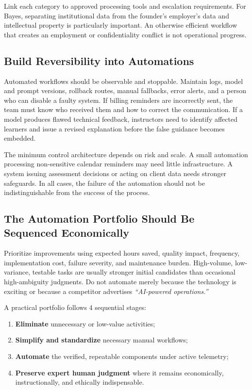 Link each category to approved processing tools and escalation requirements. For Bayes, separating institutional data from the founder's employer's data and intellectual property is particularly important. An otherwise efficient workflow that creates an employment or confidentiality conflict is not operational progress.

\subsection{Build Reversibility into Automations}
\label{sec:reversibility_in_automation}

Automated workflows should be observable and stoppable. Maintain logs, model and prompt versions, rollback routes, manual fallbacks, error alerts, and a person who can disable a faulty system. If billing reminders are incorrectly sent, the team must know who received them and how to correct the communication. If a model produces flawed technical feedback, instructors need to identify affected learners and issue a revised explanation before the false guidance becomes embedded.

The minimum control architecture depends on risk and scale. A small automation processing non-sensitive calendar reminders may need little infrastructure. A system issuing assessment decisions or acting on client data needs stronger safeguards. In all cases, the failure of the automation should not be indistinguishable from the success of the process.

\subsection{The Automation Portfolio Should Be Sequenced Economically}
\label{sec:sequencing_automation}

Prioritize improvements using expected hours saved, quality impact, frequency, implementation cost, failure severity, and maintenance burden. High-volume, low-variance, testable tasks are usually stronger initial candidates than occasional high-ambiguity judgments. Do not automate merely because the technology is exciting or because a competitor advertises \textit{``AI-powered operations.''}

A practical portfolio follows 4 sequential stages:
\begin{enumerate}
    \item \textbf{Eliminate} unnecessary or low-value activities;
    \item \textbf{Simplify and standardize} necessary manual workflows;
    \item \textbf{Automate} the verified, repeatable components under active telemetry;
    \item \textbf{Preserve expert human judgment} where it remains economically, instructionally, and ethically indispensable.
\end{enumerate}

